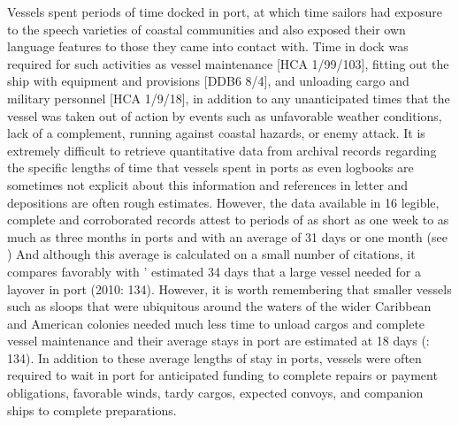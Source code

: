Vessels spent periods of time docked in port, at which time sailors had exposure to the speech varieties of coastal communities and also exposed their own language features to those they came into contact with. Time in dock was required for such activities as vessel maintenance [HCA 1/99/103], fitting out the ship with equipment and provisions [DDB6 8/4], and unloading cargo and military personnel [HCA 1/9/18], in addition to any unanticipated times that the vessel was taken out of action by events such as unfavorable weather conditions, lack of a  complement, running against coastal hazards, or enemy attack. It is extremely difficult to retrieve quantitative data from archival records regarding the specific lengths of time that vessels spent in ports as even logbooks are sometimes not explicit about this information and references in letter and depositions are often rough estimates. However, the data available in 16 legible, complete and corroborated records attest to periods of as short as one week to as much as three months in ports and with an average of 31 days or one month (see ) And although this average is calculated on a small number of citations, it compares favorably with \citeauthor{Jarvis2010}’ estimated 34 days that a large vessel needed for a layover in port (2010: 134). However, it is worth remembering that smaller vessels such as sloops that were ubiquitous around the waters of the wider Caribbean and American colonies needed much less time to unload cargos and complete vessel maintenance and their average stays in port are estimated at 18 days (\citealt{Jarvis2010}: 134). In addition to these average lengths of stay in ports, vessels were often required to wait in port for anticipated funding to complete repairs or payment obligations, favorable winds, tardy cargos, expected convoys, and companion ships to complete preparations. 

